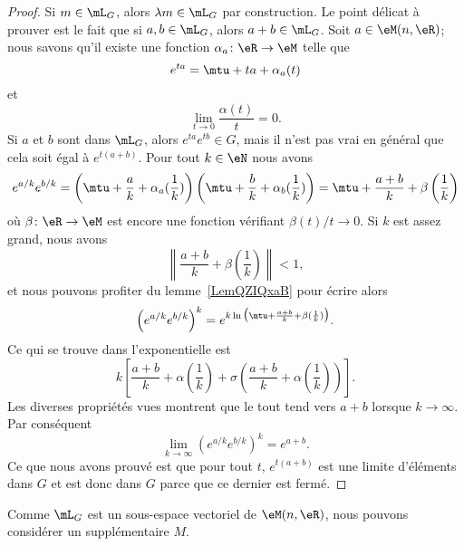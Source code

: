 \begin{proof}
	Si \( m\in\mL_G\), alors \( \lambda m\in\mL_G\) par construction. Le point délicat à prouver est le fait que si \( a,b\in \mL_G\), alors \( a+b\in\mL_G\). Soit \( a\in \eM(n,\eR)\); nous savons qu'il existe une fonction \( \alpha_a\colon \eR\to \eM\) telle que
	\begin{equation}
		e^{ta}=\mtu+ta+\alpha_a(t)
	\end{equation}
	et
	\begin{equation}
		\lim_{t\to 0} \frac{ \alpha(t) }{ t }=0.
	\end{equation}
	Si \( a\) et \( b\) sont dans \( \mL_G\), alors \(  e^{ta} e^{tb}\in G\), mais il n'est pas vrai en général que cela soit égal à \(  e^{t(a+b)}\). Pour tout \( k\in \eN\) nous avons
	\begin{equation}
		e^{a/k} e^{b/k}=\left( \mtu+\frac{ a }{ k }+\alpha_a(\frac{1}{ k }) \right)\left( \mtu+\frac{ b }{ k }+\alpha_b(\frac{1}{ k }) \right)=\mtu+\frac{ a+b }{k}+\beta\left( \frac{1}{ k } \right)
	\end{equation}
	où \( \beta\colon \eR\to \eM\) est encore une fonction vérifiant \( \beta(t)/t\to 0\). Si \( k\) est assez grand, nous avons
	\begin{equation}
		\left\| \frac{ a+b }{ k }+\beta(\frac{1}{ k })  \right\|<1,
	\end{equation}
	et nous pouvons profiter du lemme~\ref{LemQZIQxaB} pour écrire alors
	\begin{equation}
		\left(  e^{a/k} e^{b/k} \right)^k= e^{k\ln\big(\mtu+\frac{ a+b }{ k }+\beta(\frac{1}{ k })\big)}.
	\end{equation}
	Ce qui se trouve dans l'exponentielle est
	\begin{equation}
		k\left[ \frac{ a+b }{ k }+\alpha( \frac{1}{ k })+\sigma\left( \frac{ a+b }{ k }+\alpha(\frac{1}{ k }) \right) \right].
	\end{equation}
	Les diverses propriétés vues montrent que le tout tend vers \( a+b\) lorsque \( k\to \infty\). Par conséquent
	\begin{equation}
		\lim_{k\to \infty} \left(  e^{a/k} e^{b/k} \right)^k= e^{a+b}.
	\end{equation}
	Ce que nous avons prouvé est que pour tout \( t\), \(  e^{t(a+b)}\) est une limite d'éléments dans \( G\) et est donc dans \( G\) parce que ce dernier est fermé.
\end{proof}

Comme \( \mL_G\) est un sous-espace vectoriel de \( \eM(n,\eR)\), nous pouvons considérer un supplémentaire \( M\).

